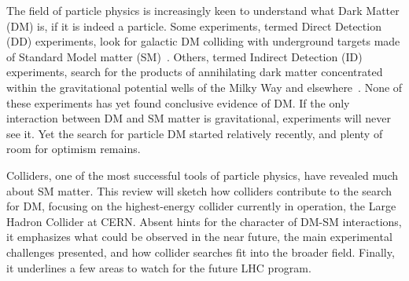 

The field of particle physics is increasingly keen to understand what Dark Matter (DM) is, if it is indeed a particle. 
Some experiments, termed Direct Detection (DD) experiments, look for galactic DM colliding with underground targets made of Standard Model matter (SM)~\cite{0954-3899-43-1-013001}.
Others, termed Indirect Detection (ID) experiments, search for the products of annihilating dark matter concentrated within the gravitational potential wells of the Milky Way and elsewhere~\cite{Gaskins:2016cha}.
None of these experiments has yet found conclusive evidence of DM.
If the only interaction between DM and SM matter is gravitational, experiments will never see it.
Yet the search for particle DM started relatively recently, and plenty of room for optimism remains.

Colliders, one of the most successful tools of particle physics, have revealed much about SM matter.
This review will sketch how colliders contribute to the search for DM, focusing on the highest-energy collider currently in operation, the Large Hadron Collider at CERN.
Absent hints for the character of DM-SM interactions, it emphasizes what could be observed in the near future, the main experimental challenges presented, and how collider searches fit into the broader field.
Finally, it underlines a few areas to watch for the future LHC program.








